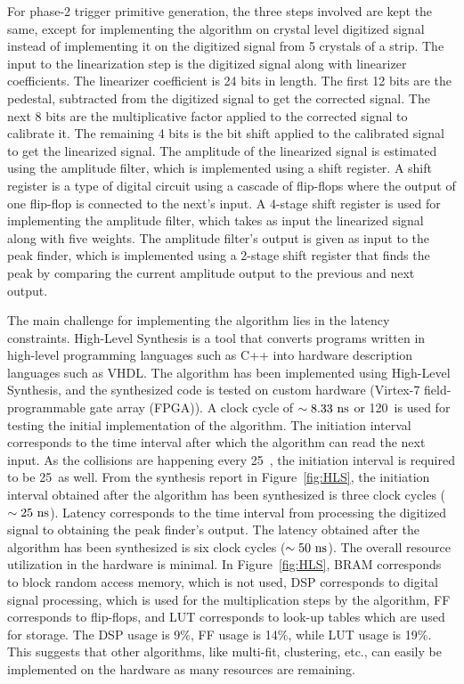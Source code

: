 For phase-2 trigger primitive generation, the three steps involved are kept the same, except for implementing the algorithm on crystal level digitized signal instead of implementing it on the digitized signal from 5 crystals of a strip. The input to the linearization step is the digitized signal along with linearizer coefficients. The linearizer coefficient is 24 bits in length. The first 12 bits are the pedestal, subtracted from the digitized signal to get the corrected signal. The next 8 bits are the multiplicative factor applied to the corrected signal to calibrate it. The remaining 4 bits is the bit shift applied to the calibrated signal to get the linearized signal. The amplitude of the linearized signal is estimated using the amplitude filter, which is implemented using a shift register. A shift register is a type of digital circuit using a cascade of flip-flops where the output of one flip-flop is connected to the next's input. A 4-stage shift register is used for implementing the amplitude filter, which takes as input the linearized signal along with five weights. The amplitude filter's output is given as input to the peak finder, which is implemented using a 2-stage shift register that finds the peak by comparing the current amplitude output to the previous and next output.

The main challenge for implementing the algorithm lies in the latency constraints. High-Level Synthesis is a tool that converts programs written in high-level programming languages such as C++ into hardware description languages such as VHDL. The algorithm has been implemented using High-Level Synthesis, and the synthesized code is tested on custom hardware (Virtex-7 field-programmable gate array (FPGA)). A clock cycle of $\sim 8.33~\text{ns}$ or 120~\mhz is used for testing the initial implementation of the algorithm. The initiation interval corresponds to the time interval after which the algorithm can read the next input. As the collisions are happening every 25~\ns, the initiation interval is required to be 25~\ns as well. From the synthesis report in Figure~\ref{fig:HLS}, the initiation interval obtained after the algorithm has been synthesized is three clock cycles ($\sim 25~\text{ns}$). Latency corresponds to the time interval from processing the digitized signal to obtaining the peak finder's output. The latency obtained after the algorithm has been synthesized is six clock cycles ($\sim 50~\text{ns}$). The overall resource utilization in the hardware is minimal. In Figure~\ref{fig:HLS}, BRAM corresponds to block random access memory, which is not used, DSP corresponds to digital signal processing, which is used for the multiplication steps by the algorithm, FF corresponds to flip-flops, and LUT corresponds to look-up tables which are used for storage. The DSP usage is 9\%, FF usage is 14\%, while LUT usage is 19\%. This suggests that other algorithms, like multi-fit, clustering, etc., can easily be implemented on the hardware as many resources are remaining.

